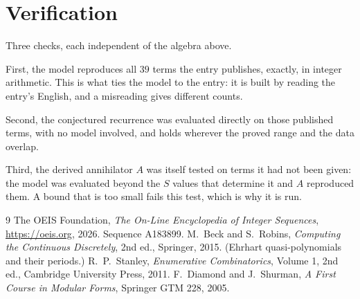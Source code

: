 \documentclass[11pt,a4paper]{article}
\theoremstyle{plain}
\theoremstyle{definition}
\begin{document}
\section{Verification}

Three checks, each independent of the algebra above.

First, the model reproduces all $39$ terms the entry publishes, exactly, in integer
arithmetic. This is what ties the model to the entry: it is built by reading the entry's
English, and a misreading gives different counts.

Second, the conjectured recurrence was evaluated directly on those published terms, with no
model involved, and holds wherever the proved range and the data overlap.

Third, the derived annihilator $A$ was itself tested on terms it had not been given: the model
was evaluated beyond the $S$ values that determine it and $A$ reproduced them. A bound that is
too small fails this test, which is why it is run.

\begin{thebibliography}{9}
 The OEIS Foundation, \emph{The On-Line Encyclopedia of Integer
Sequences}, \url{https://oeis.org}, 2026. Sequence A183899.
 M.~Beck and S.~Robins, \emph{Computing the Continuous Discretely},
2nd ed., Springer, 2015. (Ehrhart quasi-polynomials and their periods.)
 R.~P.~Stanley, \emph{Enumerative Combinatorics}, Volume 1, 2nd ed.,
Cambridge University Press, 2011.
 F.~Diamond and J.~Shurman, \emph{A First Course in Modular Forms},
Springer GTM 228, 2005.
\end{thebibliography}
\end{document}
